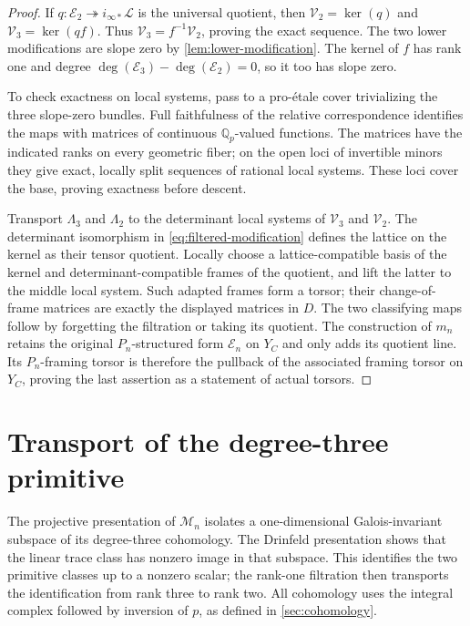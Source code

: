 \documentclass[11pt]{article}
\numberwithin{equation}{section}
\theoremstyle{definition}
\theoremstyle{remark}
\newcommand{\Q}{\mathbb Q}
\begin{document}
\begin{proof}
If $q:\mathcal E_2\twoheadrightarrow i_{\infty *}\mathcal L$
is the universal quotient, then
$\mathcal V_2=\ker(q)$ and $\mathcal V_3=\ker(qf)$.
Thus $\mathcal V_3=f^{-1}\mathcal V_2$, proving the exact sequence.
The two lower modifications are slope zero by
\cref{lem:lower-modification}.  The kernel of $f$ has rank one and
degree $\deg(\mathcal E_3)-\deg(\mathcal E_2)=0$, so it too has slope
zero.

To check exactness on local systems, pass to a pro-\'etale cover
trivializing the three slope-zero bundles.  Full faithfulness of the
relative correspondence identifies the maps with matrices of
continuous $\Q_p$-valued functions.  The matrices have the indicated
ranks on every geometric fiber; on the open loci of invertible minors
they give exact, locally split sequences of rational local systems.
These loci cover the base, proving exactness before descent.

Transport $\Lambda_3$ and $\Lambda_2$ to the determinant local systems
of $\mathcal V_3$ and $\mathcal V_2$.  The determinant isomorphism in
\cref{eq:filtered-modification} defines the lattice on the kernel as
their tensor quotient.  Locally choose a lattice-compatible basis of
the kernel and determinant-compatible frames of the quotient, and
lift the latter to the middle local system.  Such adapted frames form
a torsor; their change-of-frame matrices are exactly the displayed
matrices in $D$.  The two classifying maps follow by forgetting the
filtration or taking its quotient.  The construction of $m_n$ retains
the original $P_n$-structured form $\mathcal E_n$ on $Y_C$ and only
adds its quotient line.  Its $P_n$-framing torsor is therefore the
pullback of the associated framing torsor on $Y_C$, proving the last
assertion as a statement of actual torsors.
\end{proof}

\section{Transport of the degree-three primitive}\label{sec:degree-three}

The projective presentation of $\mathcal M_n$ isolates a
one-dimensional Galois-invariant subspace of its degree-three
cohomology. The Drinfeld presentation shows that the linear trace
class has nonzero image in that subspace. This identifies the two
primitive classes up to a nonzero scalar; the rank-one filtration
then transports the identification from rank three to rank two.
All cohomology uses the integral complex followed by inversion of
$p$, as defined in \cref{sec:cohomology}.
\end{document}
